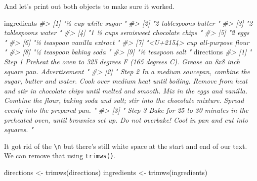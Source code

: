 \documentclass[
]{krantz}
\makeatletter
\newenvironment{Shaded}{\begin{snugshade}}{\end{snugshade}}
\newcommand{\CommentTok}[1]{\textcolor[rgb]{0.37,0.37,0.37}{\textit{#1}}}
\newcommand{\FunctionTok}[1]{\textcolor[rgb]{0,0,0}{#1}}
\newcommand{\NormalTok}[1]{#1}
\newcommand{\OtherTok}[1]{\textcolor[rgb]{0.37,0.37,0.37}{#1}}
\newenvironment{kframe}{%
\medskip{}
\setlength{\fboxsep}{.8em}
 \def\at@end@of@kframe{}%
 \ifinner\ifhmode%
  \def\at@end@of@kframe{\end{minipage}}%
  \begin{minipage}{\columnwidth}%
 \fi\fi%
 \def\FrameCommand##1{\hskip\@totalleftmargin \hskip-\fboxsep
 \colorbox{shadecolor}{##1}\hskip-\fboxsep
     \hskip-\linewidth \hskip-\@totalleftmargin \hskip\columnwidth}%
 \MakeFramed {\advance\hsize-\width
   \@totalleftmargin\z@ \linewidth\hsize
   \@setminipage}}%
 {\par\unskip\endMakeFramed%
 \at@end@of@kframe}
\renewenvironment{Shaded}{\begin{kframe}}{\end{kframe}}
\makeatother
\begin{document}
And let's print out both objects to make sure it worked.

\begin{Shaded}
\begin{Highlighting}[]
\NormalTok{ingredients}
\CommentTok{\#\textgreater{} [1] "½ cup white sugar "                 }
\CommentTok{\#\textgreater{} [2] "2 tablespoons butter "              }
\CommentTok{\#\textgreater{} [3] "2 tablespoons water "               }
\CommentTok{\#\textgreater{} [4] "1 ½ cups semisweet chocolate chips "}
\CommentTok{\#\textgreater{} [5] "2 eggs "                            }
\CommentTok{\#\textgreater{} [6] "½ teaspoon vanilla extract "        }
\CommentTok{\#\textgreater{} [7] "\textless{}U+2154\textgreater{} cup all{-}purpose flour "    }
\CommentTok{\#\textgreater{} [8] "¼ teaspoon baking soda "            }
\CommentTok{\#\textgreater{} [9] "½ teaspoon salt "}
\NormalTok{directions}
\CommentTok{\#\textgreater{} [1] "   Step 1   Preheat the oven to 325 degrees F (165 degrees C). Grease an 8x8 inch square pan.    Advertisement "                                                                                                                                                                                                                 }
\CommentTok{\#\textgreater{} [2] "   Step 2   In a medium saucepan, combine the sugar, butter and water. Cook over medium heat until boiling. Remove from heat and stir in chocolate chips until melted and smooth. Mix in the eggs and vanilla. Combine the flour, baking soda and salt; stir into the chocolate mixture. Spread evenly into the prepared pan.   "}
\CommentTok{\#\textgreater{} [3] "   Step 3   Bake for 25 to 30 minutes in the preheated oven, until brownies set up. Do not overbake! Cool in pan and cut into squares.   "}
\end{Highlighting}
\end{Shaded}

It got rid of the \texttt{\textbackslash{}n} but there's still white space at the start and end of our text. We can remove that using \texttt{trimws()}.

\begin{Shaded}
\begin{Highlighting}[]
\NormalTok{directions }\OtherTok{\textless{}{-}} \FunctionTok{trimws}\NormalTok{(directions)}
\NormalTok{ingredients }\OtherTok{\textless{}{-}} \FunctionTok{trimws}\NormalTok{(ingredients)}
\end{Highlighting}
\end{Shaded}
\end{document}
